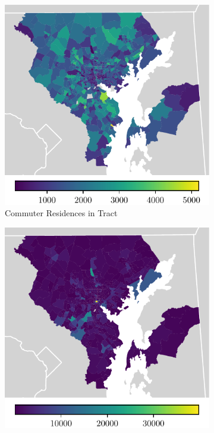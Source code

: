 \documentclass[11pt]{article}
\numberwithin{equation}{section} %
\numberwithin{figure}{section} %
\numberwithin{table}{section} %
\theoremstyle{definition}
\begin{document}
\begin{figure}[t!]
	\caption{Baltimore Metro Area Census Tracts by Commuter Volume and Flow}
  \begin{subfigure}{0.49\textwidth}
    \centering
    \includegraphics[width=\textwidth]{maps/tract_home.pdf}
    \caption{Commuter Residences in Tract}
  \end{subfigure}
  \begin{subfigure}{0.49\textwidth}
    \centering
    \includegraphics[width=\textwidth]{maps/tract_work.pdf}

\end{subfigure}
\end{figure}
\end{document}
